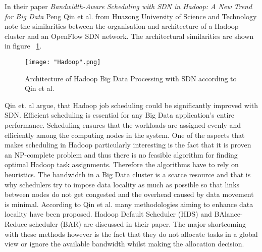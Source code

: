 \documentclass{acm_proc_article-sp}
\begin{document}
In their paper \textit{Bandwidth-Aware Scheduling with SDN in Hadoop: A New Trend for Big Data} \cite{Scheduling} Peng Qin et al. from Huazong University of Science and Technology note the similarities between the organisation and architecture of a Hadoop cluster and an OpenFlow SDN network. The architectural similarities are shown in figure ~\ref{fig:hadoop}.

\begin{figure}[ht!]
\centering
{}
\texttt{[image: "Hadoop".png]}
\caption{Architecture of Hadoop Big Data Processing with SDN according to Qin et al. \cite{Scheduling}}
\label{fig:hadoop}
\end{figure} 

Qin et. al argue, that Hadoop job scheduling could be significantly improved with SDN. Efficient scheduling is essential for any Big Data application's entire performance. Scheduling ensures that the workloads are assigned evenly and efficiently among the computing nodes in the system. One of the aspects that makes scheduling in Hadoop particularly interesting is the fact that it is proven an NP-complete problem \cite{Fischer:2010:ATE:1810479.1810484} and thus there is no feasible algorithm for finding optimal Hadoop task assignments. Therefore the algorithms have to rely on heuristics. The bandwidth in a Big Data cluster is a scarce resource and that is why schedulers try to impose data locality as much as possible so that links between nodes do not get congested and the overhead caused by data movement is minimal. According to Qin et al. many methodologies aiming to enhance data locality have been proposed. Hadoop Default Scheduler (HDS) and BAlance-Reduce scheduler (BAR) are discussed in their paper. The major shortcoming with these methods however is the fact that they do not allocate tasks in a global view or ignore the available bandwidth whilst making the allocation decision.
\end{document}
